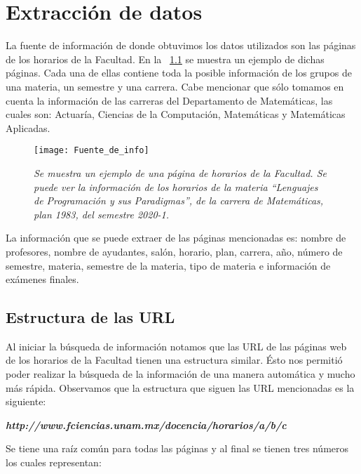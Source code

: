 \chapter{Extracción de datos}

La fuente de información de donde obtuvimos los datos utilizados son las páginas de los horarios de la Facultad. En la \figurename{~\ref{pagFC}} se muestra un ejemplo de dichas páginas. Cada una de ellas contiene toda la posible información de los grupos de una materia, un semestre y una carrera. Cabe mencionar que sólo tomamos en cuenta la información de las carreras del Departamento de Matemáticas, las cuales son: Actuaría, Ciencias de la Computación, Matemáticas y Matemáticas Aplicadas.

\begin{figure}[H]
\centering
\texttt{[image: Fuente\_de\_info]} %
\caption[\textit{Página de horarios de la Facultad}]{\textit{Se muestra un ejemplo de una página de horarios de la Facultad. Se puede ver la información de los horarios de la materia ``Lenguajes de Programación y sus Paradigmas'', de la carrera de Matemáticas, plan 1983, del semestre 2020-1.}}\label{pagFC}
\end{figure}

La información que se puede extraer de las páginas mencionadas es: nombre de profesores, nombre de ayudantes, salón, horario, plan, carrera, año, número de semestre, materia, semestre de la materia, tipo de materia e información de exámenes finales.


\section{Estructura de las URL} \label{Sec_ED_estructura_URL}

Al iniciar la búsqueda de información notamos que las URL de las páginas web de los horarios de la Facultad tienen una estructura similar. Ésto nos permitió poder realizar la búsqueda de la información de una manera automática y mucho más rápida. Observamos que la estructura que siguen las URL mencionadas es la siguiente:
  
  \begin{center}
\textit{\textbf{http://www.fciencias.unam.mx/docencia/horarios/a/b/c}}
\end{center}

Se tiene una raíz común para todas las páginas y al final se tienen tres números los cuales representan:
  
